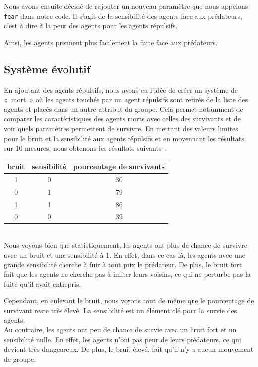 \documentclass[french, a4paper, 12pt, openany]{report}
\begin{document}
   Nous avons ensuite décidé de rajouter un nouveau paramètre que nous appelons \verb|fear| dans notre code. Il s'agit de la sensibilité des agents face aux prédateurs, c'est à dire à la peur des agents pour les agents répulsifs. 
   
   Ainsi, les agents prennent plus facilement la fuite face aux prédateurs.      
   

	\subsection{Système évolutif}
	
		En ajoutant des agents répulsifs, nous avons eu l'idée de créer un système de «~mort~» où les agents touchés par un agent répulsifs sont retirés de la liste des agents et placés dans un autre attribut du groupe. Cela permet notamment de comparer les caractéristiques des agents morts avec celles des survivants et de voir quels paramètres permettent de survivre. En mettant des valeurs limites pour le bruit et la sensibilité aux agents répulsifs et en moyennant les résultats sur 10 mesures, nous obtenons les résultats suivants~:\\
		
		\begin{tabular}{|c|c|c|} \hline
		\centering
			bruit & sensibilité & pourcentage de survivants \\ \hline
			1 & 0 & 30 \\ \hline
			0 & 1 & 79 \\ \hline
			1 & 1 & 86 \\ \hline
			0 & 0 & 39 \\ \hline
		\end{tabular}\\

   Nous voyons bien que statistiquement, les agents ont plus de chance de survivre avec un bruit et une sensibilité à 1. En effet, dans ce cas là, les agents avec une grande sensibilité cherche à fuir à tout prix le prédateur. De plus, le bruit fort fait que les agents ne cherche pas à imiter leurs voisins, ce qui ne perturbe pas la fuite qu'il avait entrepris. 
   
   Cependant, en enlevant le bruit, nous voyons tout de même que le pourcentage de survivant reste très élevé. La sensibilité est un élément clé pour la survie des agents.\\

  Au contraire, les agents ont peu de chance de survie avec un bruit fort et un sensibilité nulle. En effet, les agents n'ont pas peur de leurs prédateurs, ce qui devient très dangeureux. De plus, le bruit élevé, fait qu'il n'y a aucun mouvement de groupe.
  
\end{document}

